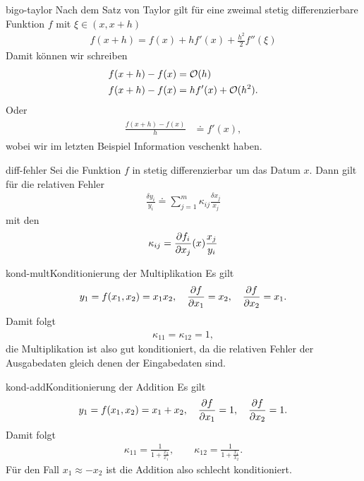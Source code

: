 \begin{Beispiel}{bigo-taylor}
  Nach dem Satz von Taylor gilt für eine zweimal stetig
  differenzierbare Funktion $f$ mit $\xi\in(x,x+h)$
  \begin{gather}
 f(x+h) = f(x) + h f'(x) + \tfrac{h^2}{2} f''(\xi)   
\end{gather}
Damit können wir schreiben
\begin{gather}
  \begin{split}
    f(x+h)-f(x) &= \mathcal O(h)\\
    f(x+h)-f(x) &=  h f'(x) + \mathcal O(h^2).
  \end{split}
\end{gather}
Oder
\begin{gather}
  \begin{split}
    \frac{f(x+h)-f(x)}h &\doteq f'(x),
  \end{split}
\end{gather}
wobei wir im letzten Beispiel Information veschenkt haben.
\end{Beispiel}

\begin{Lemma}{diff-fehler}
  Sei die Funktion $f$ in  stetig
  differenzierbar um das Datum $x$. Dann gilt für die relativen Fehler
  \begin{gather*}
    \frac{\delta y_i}{y_i}
    \doteq \sum_{j=1}^m \kappa_{ij}\frac{\delta x_j}{x_j}
  \end{gather*}
  mit den 
  \begin{gather}
    \kappa_{ij} = \frac{\partial f_i}{\partial x_j}(x)
    \frac{x_j}{y_i}
  \end{gather}
\end{Lemma}

\begin{Beispiel*}{kond-mult}{Konditionierung der Multiplikation}
  Es gilt
  \begin{gather}
    y_1 = f(x_1,x_2) = x_1 x_2,
    \quad \frac{\partial f}{\partial x_1} = x_2,
    \quad \frac{\partial f}{\partial x_2} = x_1.
  \end{gather}
  Damit folgt
  \begin{gather}
    \kappa_{11} = \kappa_{12} = 1,
  \end{gather}
  die Multiplikation ist also gut konditioniert, da die relativen
  Fehler der Ausgabedaten gleich denen der Eingabedaten sind.
\end{Beispiel*}

\begin{Beispiel*}{kond-add}{Konditionierung der Addition}
  Es gilt
  \begin{gather}
    y_1 = f(x_1,x_2) = x_1 + x_2,
    \quad \frac{\partial f}{\partial x_1} = 1,
    \quad \frac{\partial f}{\partial x_2} = 1.
  \end{gather}
  Damit folgt
  \begin{gather}
    \kappa_{11} = \frac{1}{1+\frac{x_2}{x_1}},
    \qquad\kappa_{12} = \frac{1}{1+\frac{x_1}{x_2}}.
  \end{gather}
  Für den Fall $x_1 \approx -x_2$ ist die Addition also schlecht konditioniert.
\end{Beispiel*}

